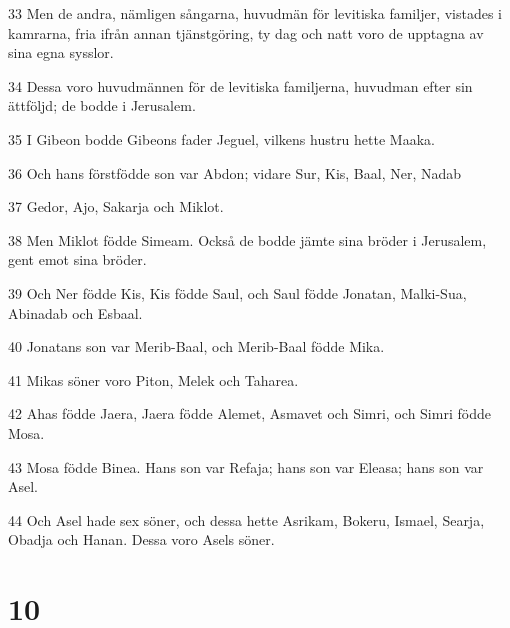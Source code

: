 \par 33 Men de andra, nämligen sångarna, huvudmän för levitiska familjer, vistades i kamrarna, fria ifrån annan tjänstgöring, ty dag och natt voro de upptagna av sina egna sysslor.
\par 34 Dessa voro huvudmännen för de levitiska familjerna, huvudman efter sin ättföljd; de bodde i Jerusalem.
\par 35 I Gibeon bodde Gibeons fader Jeguel, vilkens hustru hette Maaka.
\par 36 Och hans förstfödde son var Abdon; vidare Sur, Kis, Baal, Ner, Nadab
\par 37 Gedor, Ajo, Sakarja och Miklot.
\par 38 Men Miklot födde Simeam. Också de bodde jämte sina bröder i Jerusalem, gent emot sina bröder.
\par 39 Och Ner födde Kis, Kis födde Saul, och Saul födde Jonatan, Malki-Sua, Abinadab och Esbaal.
\par 40 Jonatans son var Merib-Baal, och Merib-Baal födde Mika.
\par 41 Mikas söner voro Piton, Melek och Taharea.
\par 42 Ahas födde Jaera, Jaera födde Alemet, Asmavet och Simri, och Simri födde Mosa.
\par 43 Mosa födde Binea. Hans son var Refaja; hans son var Eleasa; hans son var Asel.
\par 44 Och Asel hade sex söner, och dessa hette Asrikam, Bokeru, Ismael, Searja, Obadja och Hanan. Dessa voro Asels söner.

\chapter{10}

